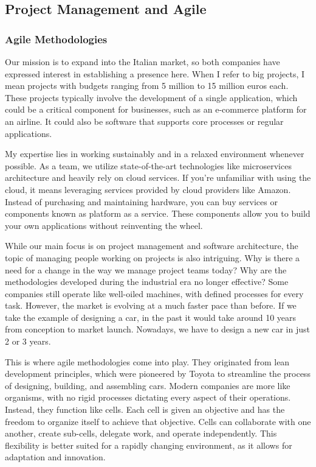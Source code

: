 \subsection{Project Management and Agile}

\subsubsection{Agile Methodologies}

Our mission is to expand into the Italian market, so both companies have
expressed interest in establishing a presence here. When I refer to big
projects, I mean projects with budgets ranging from 5 million to 15
million euros each. These projects typically involve the development of
a single application, which could be a critical component for
businesses, such as an e-commerce platform for an airline. It could also
be software that supports core processes or regular applications.

My expertise lies in working sustainably and in a relaxed environment
whenever possible. As a team, we utilize state-of-the-art technologies
like microservices architecture and heavily rely on cloud services. If
you're unfamiliar with using the cloud, it means leveraging services
provided by cloud providers like Amazon. Instead of purchasing and
maintaining hardware, you can buy services or components known as
platform as a service. These components allow you to build your own
applications without reinventing the wheel.

While our main focus is on project management and software architecture,
the topic of managing people working on projects is also intriguing. Why
is there a need for a change in the way we manage project teams today?
Why are the methodologies developed during the industrial era no longer
effective? Some companies still operate like well-oiled machines, with
defined processes for every task. However, the market is evolving at a
much faster pace than before. If we take the example of designing a car,
in the past it would take around 10 years from conception to market
launch. Nowadays, we have to design a new car in just 2 or 3 years.

This is where agile methodologies come into play. They originated from
lean development principles, which were pioneered by Toyota to
streamline the process of designing, building, and assembling cars.
Modern companies are more like organisms, with no rigid processes
dictating every aspect of their operations. Instead, they function like
cells. Each cell is given an objective and has the freedom to organize
itself to achieve that objective. Cells can collaborate with one
another, create sub-cells, delegate work, and operate independently.
This flexibility is better suited for a rapidly changing environment, as
it allows for adaptation and innovation.

